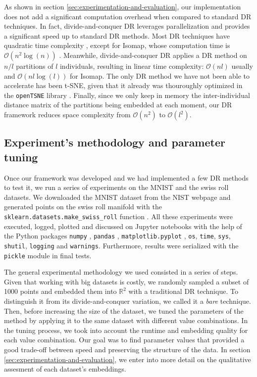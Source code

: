 As shown in section \ref{sec:experimentation-and-evaluation}, our implementation does not add a significant computation overhead when compared to standard DR techniques. In fact, divide-and-conquer DR leverages parallelization and provides a significant speed up to standard DR methods. Most DR techniques have quadratic time complexity \citep{Kruskal1964a,Kruskal1964b,Chen2009, Vandermaaten2008}, except for Isomap, whose computation time is $\mathcal{O}(n^2\log(n))$ \citep{Tenenbaum2000}. Meanwhile, divide-and-conquer DR applies a DR method on $n/l$ partitions of $l$ individuals, resulting in linear time complexity: $\mathcal{O}(nl)$ usually and $\mathcal{O}(nl\log(l))$ for Isomap. The only DR method we have not been able to accelerate has been t-SNE, given that it already was thouroughly optimized in the \verb|openTSNE| library \citep{Policar2024}. Finally, since we only keep in memory the inter-individual distance matrix of the partitions being embedded at each moment, our DR framework reduces space complexity from $\mathcal{O}(n^2)$ to $\mathcal{O}(l^2)$.


\subsection{Experiment's methodology and parameter tuning}
\label{sec:experiment-methodology-parameter-tuning}

Once our framework was developed and we had implemented a few DR methods to test it, we run a series of experiments on the MNIST \citep{Cohen2017} and the swiss roll \citep{Tenenbaum2000} datasets. We downloaded the MNIST dataset from the NIST webpage \citep{NIST2024} and generated points on the swiss roll manifold with the \verb|sklearn.datasets.make_swiss_roll| function \citep{Pedregosa2011}. All these experiments were executed, logged, plotted and discussed on Jupyter notebooks \citep{Kluyver2016} with the help of the Python packages \verb|numpy| \citep{Harris2020}, \verb|pandas| \citep{Mckinney2010}, \verb|matplotlib.pyplot| \citep{Hunter2007}, \verb|os|, \verb|time|, \verb|sys|, \verb|shutil|, \verb|logging| and \verb|warnings|. Furthermore, results were serialized with the \verb|pickle| module in final tests.

The general experimental methodology we used consisted in a series of steps. Given that working with big datasets is costly, we randomly sampled a subset of 1000 points and embedded them into $\mathbb{R}^2$ with a traditional DR technique. To distinguish it from its divide-and-conquer variation, we called it a \textit{bare} technique. Then, before increasing the size of the dataset, we tuned the parameters of the method by applying it to the same dataset with different value combinations. In the tuning process, we took into account the runtime and embedding quality for each value combination. Our goal was to find parameter values that provided a good trade-off between speed and preserving the structure of the data. In section \ref{sec:experimentation-and-evaluation}, we enter into more detail on the qualitative assesment of each dataset's embeddings.

